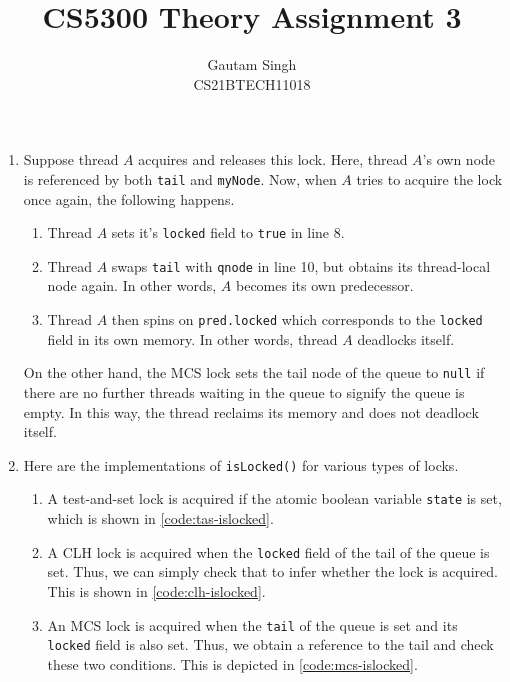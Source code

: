 \documentclass[conference,compsoc,onecolumn]{IEEEtran}
\begin{document}
\vspace{3cm}
\title{CS5300 Theory Assignment 3}
\author{Gautam Singh\\CS21BTECH11018}
\maketitle

\bigskip

\begin{enumerate}
    \item Suppose thread \(A\) acquires and releases this lock. Here, thread
    \(A\)'s own node is referenced by both \texttt{tail} and \texttt{myNode}.
    Now, when \(A\) tries to acquire the lock once again, the following happens.
    \begin{enumerate}
        \item Thread \(A\) sets it's \texttt{locked} field to \texttt{true} in
        line 8.
        \item Thread \(A\) swaps \texttt{tail} with \texttt{qnode} in line 10,
        but obtains its thread-local node again. In other words, \(A\) becomes
        its own predecessor.
        \item Thread \(A\) then spins on \texttt{pred.locked} which corresponds
        to the \texttt{locked} field in its own memory. In other words, thread
        \(A\) deadlocks itself.
    \end{enumerate}

    On the other hand, the MCS lock sets the tail node of the queue to
    \texttt{null} if there are no further threads waiting in the queue to
    signify the queue is empty. In this way, the thread reclaims its memory and
    does not deadlock itself.

    \item Here are the implementations of \texttt{isLocked()} for various types
    of locks.
    \begin{enumerate}
        \item A test-and-set lock is acquired if the atomic boolean variable
        \texttt{state} is set, which is shown in \autoref{code:tas-islocked}.

        \item A CLH lock is acquired when the \texttt{locked} field of the tail
        of the queue is set. Thus, we can simply check that to infer whether the
        lock is acquired. This is shown in \autoref{code:clh-islocked}.

        \item An MCS lock is acquired when the \texttt{tail} of the queue is set
        and its \texttt{locked} field is also set. Thus, we obtain a reference
        to the tail and check these two conditions. This is depicted in
        \autoref{code:mcs-islocked}.
    \end{enumerate}


\end{enumerate}
\end{document}
